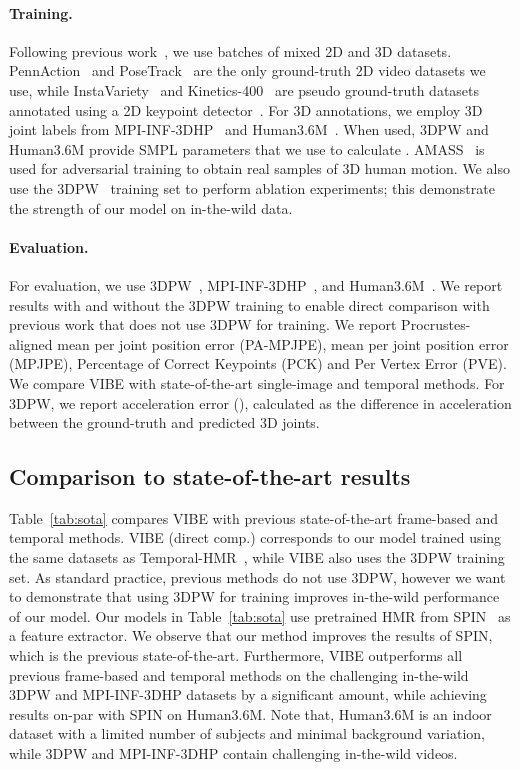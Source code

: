 \documentclass[10pt,twocolumn,letterpaper]{article}
\begin{document}
\paragraph{Training.} Following previous work~\cite{kanazawa_hmr,kanazawa_temporal_hmr, SPIN:ICCV:2019}, we use batches of mixed 2D and 3D datasets. PennAction~\cite{pennaction} and PoseTrack~\cite{PoseTrack} are the only ground-truth 2D video datasets we use, while InstaVariety~\cite{kanazawa_temporal_hmr} and Kinetics-400~\cite{kinetics400} are pseudo ground-truth datasets annotated using a 2D keypoint detector~\cite{cao2018openpose,kocabas18prn}. 
For 3D annotations, we employ 3D joint labels from MPI-INF-3DHP~\cite{mpiiinf3dhp_mono-2017} and Human3.6M~\cite{ionescu_h36m}.
When used, 3DPW and Human3.6M provide SMPL parameters that we use to calculate . 
AMASS~\cite{AMASS:2019} is used for adversarial training to obtain real samples of 3D human motion. 
We also use the 3DPW~\cite{vonMarcard2018_3dpw} training set to perform ablation experiments; this demonstrate the strength of our model on  in-the-wild data. 

\paragraph{Evaluation.} For evaluation, we use 3DPW~\cite{vonMarcard2018_3dpw}, MPI-INF-3DHP~\cite{mpiiinf3dhp_mono-2017}, and Human3.6M~\cite{ionescu_h36m}. We report results with and without the 3DPW training to enable direct comparison with previous work that does not use 3DPW for training. 
We report Procrustes-aligned mean per joint position error (PA-MPJPE), mean per joint position error (MPJPE), Percentage of Correct Keypoints (PCK) and Per Vertex Error (PVE).  
We compare VIBE with state-of-the-art single-image and temporal methods. 
For 3DPW, we report acceleration error (), calculated as the difference in acceleration between the ground-truth and predicted 3D joints. 

\subsection{Comparison to state-of-the-art results}


Table~\ref{tab:sota} compares VIBE with previous state-of-the-art  frame-based and temporal methods. VIBE (direct comp.) corresponds to our model trained using the same datasets as Temporal-HMR~\cite{kanazawa_temporal_hmr}, while VIBE also uses the 3DPW training set. As standard practice, previous methods do not use 3DPW, however we want to demonstrate that using 3DPW for training improves in-the-wild performance of our model. Our models in Table~\ref{tab:sota} use pretrained HMR from SPIN~\cite{SPIN:ICCV:2019} as a feature extractor. We observe that our method improves the results of SPIN, which is the previous state-of-the-art. Furthermore, VIBE outperforms all previous frame-based and temporal methods on the challenging in-the-wild 3DPW and MPI-INF-3DHP datasets by a significant amount, while achieving results on-par with SPIN on Human3.6M. Note that, Human3.6M is an indoor dataset with a limited number of subjects and minimal background variation, while 3DPW and MPI-INF-3DHP contain challenging in-the-wild videos. 
\end{document}
